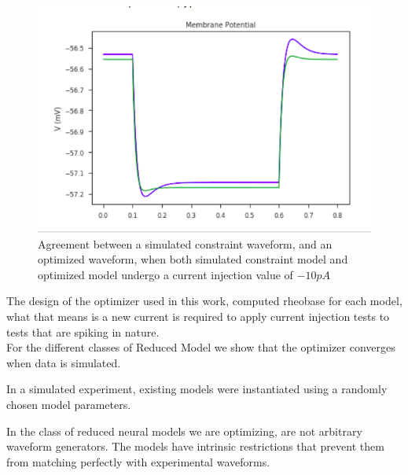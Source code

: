 
\begin{figure}
    \begin{center}
    \includegraphics[scale=0.65]{figures/passive_model_agreement}
    \caption{Agreement between a simulated constraint waveform, and an optimized waveform, when both simulated constraint model and optimized model undergo a current injection value of $-10pA$}
    \end{center}
    \label{fig:my_label}
\end{figure}




The design of the optimizer used in this work, computed rheobase for each model, what that means is a new current is required to apply current injection tests to tests that are spiking in nature.\\


For the different classes of Reduced Model we show that the optimizer converges when data is simulated.

In a simulated experiment, existing models were instantiated using a randomly chosen model parameters.

In the class of reduced neural models we are optimizing, are not arbitrary waveform generators. The models have intrinsic restrictions that prevent them from matching perfectly with experimental waveforms.

